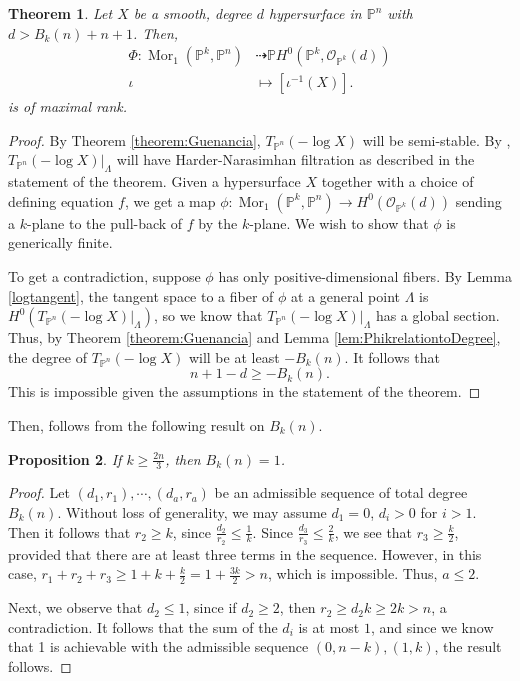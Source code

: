 \documentclass[11pt,reqno]{amsart}
\theoremstyle{plain}
\newtheorem{theorem}{Theorem}[section]
\newtheorem{proposition}[theorem]{Proposition}
\theoremstyle{definition}
\theoremstyle{remark}
\numberwithin{equation}{section}
\renewcommand{\to}{{\longrightarrow}}
\numberwithin{equation}{section}
\newcommand{\OO}{\mathscr{O}}
\newcommand{\PP}{\mathbb{P}}
\begin{document}
\begin{theorem}
\label{thm:Bbound}
Let $X$ be a smooth, degree $d$ hypersurface in $\PP^n$ with $d>B_k(n)+n+1$. Then,
\begin{align*}
    \Phi: \operatorname{Mor}_1(\PP^k,\PP^n)&\dashrightarrow \PP H^0(\PP^k,\OO_{\PP^k}(d))\\
    \iota &\mapsto [\iota^{-1}(X)].
\end{align*}
is of maximal rank.
\end{theorem}
\begin{proof}
 By Theorem \ref{theorem:Guenancia}, $T_{\PP^n}(-\log X)$ will be semi-stable. By , $T_{\PP^n}(-\log X)|_{\Lambda}$ will have Harder-Narasimhan filtration as described in the statement of the theorem.
Given a hypersurface $X$ together with a choice of defining equation $f$, we get a map $\phi: \operatorname{Mor}_1(\PP^k,\PP^n) \to H^0(\OO_{\PP^k}(d))$ sending a $k$-plane to the pull-back of $f$ by the $k$-plane. We wish to show that $\phi$ is generically finite.

 To get a contradiction, suppose $\phi$ has only positive-dimensional fibers. By Lemma \ref{logtangent}, the tangent space to a fiber of $\phi$ at a general point $\Lambda$ is $H^0(T_{\PP^n}(-\log X)|_{\Lambda})$, so we know that $T_{\PP^n}(-\log X)|_{\Lambda}$ has a global section. Thus, by Theorem \ref{theorem:Guenancia} and Lemma \ref{lem:PhikrelationtoDegree}, the degree of $T_{\PP^n}(-\log X)$ will be at least $- B_k(n)$. It follows that
 $$ n+1-d \geq - B_k(n). $$
This is impossible given the assumptions in the statement of the theorem.
\end{proof}

Then,  follows from the following result on $B_k(n)$.

\begin{proposition}
\label{prop:k2n/3}
If $k \geq \frac{2n}{3}$, then $B_k(n) = 1$.
\end{proposition}
\begin{proof}
Let $(d_1, r_1), \cdots, (d_a,r_a)$ be an admissible sequence of total degree $B_k(n)$. Without loss of generality, we may assume $d_1=0$, $d_i > 0$ for $i > 1$. Then it follows that $r_2 \geq k$, since $\frac{d_2}{r_2} \leq \frac{1}{k}$. Since $\frac{d_3}{r_3} \leq \frac{2}{k}$, we see that $r_3 \geq \frac{k}{2}$, provided that there are at least three terms in the sequence. However, in this case, $r_1+r_2+r_3 \geq 1+k+\frac{k}{2} = 1+\frac{3k}{2} > n$, which is impossible. Thus, $a \leq 2$.

Next, we observe that $d_2 \leq 1$, since if $d_2 \geq 2$, then $r_2 \geq d_2 k \geq 2k > n$, a contradiction. It follows that the sum of the $d_i$ is at most $1$, and since we know that 1 is achievable with the admissible sequence $(0,n-k), (1, k)$, the result follows.
\end{proof}
\end{document}
